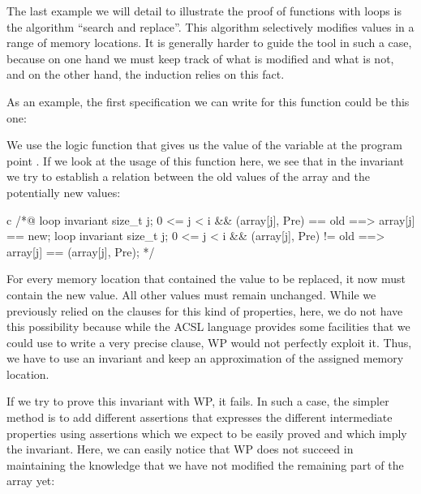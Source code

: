 \label{l4:statements-loops-ex-search-and-replace}


The last example we will detail to illustrate the proof of functions
with loops is the algorithm ``search and replace''. This algorithm
selectively modifies values in a range of memory locations. It is
generally harder to guide the tool in such a case, because on one hand
we must keep track of what is modified and what is not, and on the other
hand, the induction relies on this fact.

As an example, the first specification we can write for this function
could be this one:






We use the logic function  that gives us the
value of the variable  at the program point .
If we look at the usage of this function here, we see that in the
invariant we try to establish a relation between the old values of the
array and the potentially new values:



\begin{CodeBlock}{c}
/*@
  loop invariant \forall size_t j; 0 <= j < i && \at(array[j], Pre) == old
                   ==> array[j] == new;
  loop invariant \forall size_t j; 0 <= j < i && \at(array[j], Pre) != old
                   ==> array[j] == \at(array[j], Pre);
*/
\end{CodeBlock}



For every memory location that contained the value to be replaced, it now must
contain the new value. All other values must remain unchanged. While we
previously relied on the  clauses for this kind of properties,
here, we do not have this possibility because while the ACSL language provides
some facilities that we could use to write a very precise 
clause, WP would not perfectly exploit it. Thus, we have to use an invariant and
keep an approximation of the assigned memory location.

If we try to prove this invariant with WP, it fails. In such a case, the simpler
method is to add different assertions that expresses the different
intermediate properties using assertions which we expect to be easily proved
and which imply the invariant. Here, we can easily notice that WP does not
succeed in maintaining the knowledge that we have not modified the remaining
part of the array yet:




